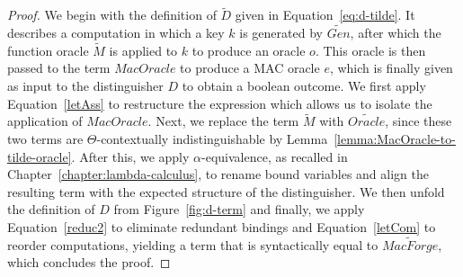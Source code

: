 \begin{proof}
We begin with the definition of $\widetilde{D}$ given in Equation~\ref{eq:d-tilde}. It describes a computation in which a key $k$ is generated by $\widetilde{Gen}$, after which the function oracle $\widetilde{M}$ is applied to $k$ to produce an oracle $o$. This oracle is then passed to the term $\mathit{MacOracle}$ to produce a MAC oracle $e$, which is finally given as input to the distinguisher $D$ to obtain a boolean outcome. We first apply Equation~\ref{letAss} to restructure the expression which allows us to isolate the application of $\mathit{MacOracle}$. Next, we replace the term $\widetilde{M}$ with $\widetilde{Oracle}$, since these two terms are $\Theta$-contextually indistinguishable by Lemma~\ref{lemma:MacOracle-to-tilde-oracle}. After this, we apply $\alpha$-equivalence, as recalled in Chapter~\ref{chapter:lambda-calculus}, to rename bound variables and align the resulting term with the expected structure of the distinguisher. We then unfold the definition of $D$ from Figure~\ref{fig:d-term} and finally, we apply Equation~\ref{reduc2} to eliminate redundant bindings and Equation~\ref{letCom} to reorder computations, yielding a term that is syntactically equal to $\widetilde{MacForge}$, which concludes the proof.


\end{proof}
